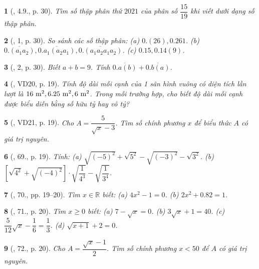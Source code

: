 \documentclass{article}
\newtheorem{baitoan}{}
\begin{document}
\begin{baitoan}[\cite{Binh_boi_duong_Toan_7_tap_1}, 4.9., p. 30]
	Tìm số thập phân thứ $2021$ của phân số $\dfrac{15}{19}$ khi viết dưới dạng số thập phân.
\end{baitoan}

\begin{baitoan}[\cite{Binh_boi_duong_Toan_7_tap_1}, 1, p. 30]
	So sánh các số thập phân: (a) $0.(26),0.261$. (b) $\overline{0.(a_1a_2)},\overline{0.a_1(a_2a_1)},\overline{0.(a_1a_2a_1a_2)}$. (c) $0.15,0.14(9)$.
\end{baitoan}

\begin{baitoan}[\cite{Binh_boi_duong_Toan_7_tap_1}, 2, p. 30]
	Biết $a + b = 9$. Tính $\overline{0.a(b)} + \overline{0.b(a)}$.
\end{baitoan}

\begin{baitoan}[\cite{Tuyen_Toan_7}, VD20, p. 19]
	Tính độ dài mỗi cạnh của 1 sân hình vuông có diện tích lần lượt là $\rm16\ m^2,6.25\ m^2,\rm6\ m^2$. Trong mỗi trường hợp, cho biết độ dài mỗi cạnh được biểu diễn bằng số hữu tỷ hay vô tỷ?
\end{baitoan}

\begin{baitoan}[\cite{Tuyen_Toan_7}, VD21, p. 19]
	Cho $A = \dfrac{5}{\sqrt{x} - 3}$. Tìm số chính phương $x$ để biểu thức $A$ có giá trị nguyên.
\end{baitoan}

\begin{baitoan}[\cite{Tuyen_Toan_7}, 69., p. 19]
	Tính: (a) $\sqrt{(-5)^2} + \sqrt{5^2} - \sqrt{(-3)^2} - \sqrt{3^2}$. (b) $\left[\sqrt{4^2} + \sqrt{(-4)^2}\right]\cdot\sqrt{\dfrac{1}{4^3}} - \sqrt{\dfrac{1}{3^4}}$.
\end{baitoan}

\begin{baitoan}[\cite{Tuyen_Toan_7}, 70., pp. 19--20]
	Tìm $x\in\mathbb{R}$ biết: (a) $4x^2 - 1 = 0$. (b) $2x^2 + 0.82 = 1$.
\end{baitoan}

\begin{baitoan}[\cite{Tuyen_Toan_7}, 71., p. 20]
	Tìm $x\ge 0$ biết: (a) $7 - \sqrt{x} = 0$. (b) $3\sqrt{x} + 1 = 40$. (c) $\dfrac{5}{12}\sqrt{x} - \dfrac{1}{6} = \dfrac{1}{3}$. (d) $\sqrt{x + 1} + 2 = 0$.
\end{baitoan}

\begin{baitoan}[\cite{Tuyen_Toan_7}, 72., p. 20]
	Cho $A = \dfrac{\sqrt{x} - 1}{2}$. Tìm số chính phương $x < 50$ để $A$ có giá trị nguyên.
\end{baitoan}
\end{document}
